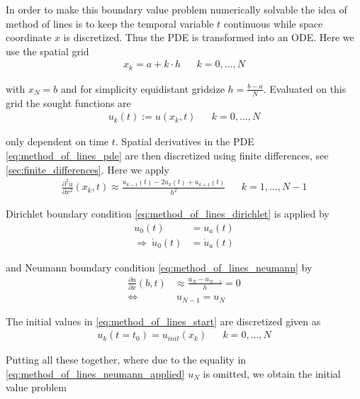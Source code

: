 \documentclass{scrartcl}[12pt, halfparskip]
\numberwithin{equation}{section}
\numberwithin{figure}{section}
\numberwithin{table}{section}
\begin{document}
In order to make this boundary value problem numerically solvable the idea of method of lines is to keep the temporal variable $t$ continuous while space coordinate $x$ is discretized. Thus the PDE is transformed into an ODE. Here we use the spatial grid
\begin{align}
	x_k = a + k \cdot h & & k=0,...,N
\end{align}

with $x_{N} = b$ and for simplicity equidistant gridsize $h = \frac{b - a}{N}$. Evaluated on this grid the sought functions are
\begin{align}
	u_k(t) := u(x_k,t) & & k=0,...,N
\end{align}

only dependent on time $t$. Spatial derivatives in the PDE \eqref{eq:method_of_lines_pde} are then discretized using finite differences, see \cref{sec:finite_differences}. Here we apply
\begin{align}
	\frac{\partial^2 u}{\partial x^2}(x_k,t) \approx \frac{u_{k-1}(t) - 2 u_k(t) + u_{k+1}(t)}{h^2} & & k=1,...,N-1
	\label{eq:discretized_second_derivative}
\end{align}

Dirichlet boundary condition \cref{eq:method_of_lines_dirichlet} is applied by
\begin{align}
	u_0(t) & = u_a(t) \\
	\Rightarrow \ \dot{u}_0(t) & = \dot{u}_a(t)
\end{align}

and Neumann boundary condition \cref{eq:method_of_lines_neumann} by
\begin{align}
	\frac{\partial u}{\partial x}(b,t) & \approx \frac{u_{N} - u_{N-1}}{h} = 0 \nonumber \\
	\Leftrightarrow & \ u_{N-1} = u_{N} \label{eq:method_of_lines_neumann_applied}
\end{align}

The initial values in \cref{eq:method_of_lines_start} are discretized given as
\begin{align}
	u_k(t=t_0) = u_{init}(x_k) & & k = 0,...,N
\end{align}

Putting all these together, where due to the equality in \cref{eq:method_of_lines_neumann_applied} $u_{N}$ is omitted, we obtain the initial value problem 
\end{document}
